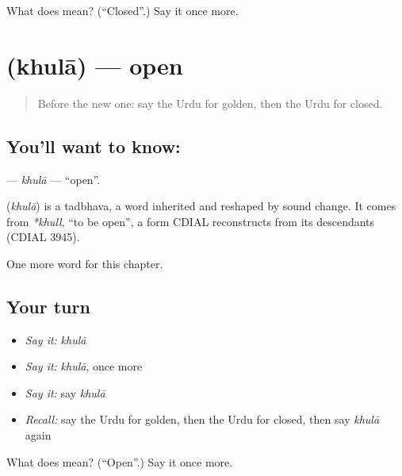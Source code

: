 \begin{tcolorbox}[breakable,colback=teal!4,colframe=teal!35!black,title={Before you move on}]
What does  mean? (\textquotedblleft{}Closed\textquotedblright{}.) Say it once more.
\end{tcolorbox}
\section[\texorpdfstring{\ur{کھلا} (khulā)}{کھلا (khulā)}]{ (khulā) — open}

\label{lesson:UR-C137-khula}



\begin{quote}
Before the new one: say the Urdu for golden, then the Urdu for closed.
\end{quote}

\subsection*{You'll want to know: }
\textbf{} — \emph{khulā} — \textquotedblleft{}open\textquotedblright{}.

\begin{cousinweb}
\textbf{} (\emph{khulā}) is a tadbhava, a word inherited and reshaped by sound change. It comes from \emph{*khull}, \textquotedblleft{}to be open\textquotedblright{}, a form CDIAL reconstructs from its descendants (CDIAL 3945).
\end{cousinweb}

\begin{grammarlens}[title={What you've built}]
One more word for this chapter.
\end{grammarlens}

\subsection*{Your turn}
\begin{itemize}
\raggedright
  \item \emph{Say it:} \emph{khulā}
  \item \emph{Say it:} \emph{khulā}, once more
  \item \emph{Say it:} say \emph{khulā}
  \item \emph{Recall:} say the Urdu for golden, then the Urdu for closed, then say \emph{khulā} again
\end{itemize}

\begin{tcolorbox}[breakable,colback=teal!4,colframe=teal!35!black,title={Before you move on}]
What does  mean? (\textquotedblleft{}Open\textquotedblright{}.) Say it once more.
\end{tcolorbox}
